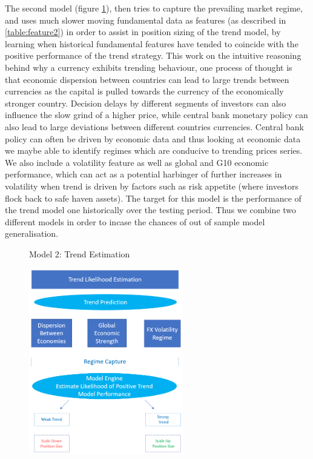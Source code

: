 \documentclass[11pt]{article}
\begin{document}
\clearpage
The second model (figure \ref{fig:TrendEstimation}), then tries to capture the prevailing market regime, and uses much slower moving fundamental data as features (as described in \ref{table:feature2}) in order to assist in position sizing of the trend model, by learning when historical fundamental features have tended to coincide with the positive performance of the trend strategy. This work on the intuitive reasoning behind why a currency exhibits trending behaviour, one process of thought is that economic dispersion between countries \cite{fxalpha} can lead to large trends between currencies as the capital is pulled towards the currency of the economically stronger country. Decision delays by different segments of investors can also influence the slow grind of a higher price, while central bank monetary policy can also lead to large deviations between different countries currencies. Central bank policy can often be driven by economic data and thus looking at economic data we maybe able to identify regimes which are conducive to trending prices series. We also include a volatility feature as well as global and G10 economic performance, which can act as a potential harbinger of further increases in volatility when trend is driven by factors such as risk appetite (where investors flock back to safe haven assets). The target for this model is the performance of the trend model one historically over the testing period. Thus we combine two different models in order to incase the chances of out of sample model generalisation.
 
\begin{figure}[h]
    \centering
	\caption{Model 2: Trend Estimation}    
	\includegraphics[width=0.6\textwidth]{TrendEstimationv2}
    \label{fig:TrendEstimation}
     \caption*{}
\end{figure}
\end{document}

